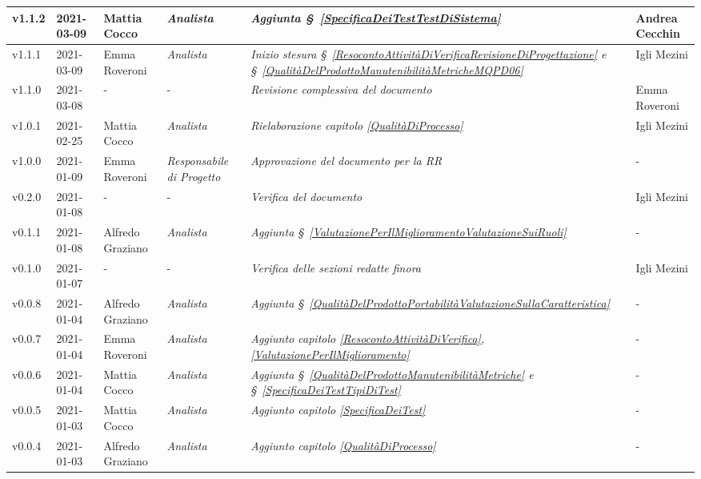 {\begin{center}
\begin{longtable}[c]{|p{2cm-1\tabcolsep}|p{2cm}|p{}|p{}|p{}|p{4cm-2\tabcolsep}|}
		\hline
		\centering v1.1.2 & 2021-03-09 & Mattia Cocco & \centering \textit{Analista}  &  \textit{Aggiunta \S~\ref{SpecificaDeiTestTestDiSistema} } & Andrea Cecchin \\
		\hline
		\centering v1.1.1 & 2021-03-09 & Emma Roveroni & \centering \textit{Analista} &  \textit{Inizio stesura \S~\ref{ResocontoAttivitàDiVerificaRevisioneDiProgettazione} e \S~\ref{QualitàDelProdottoManutenibilitàMetricheMQPD06}} & Igli Mezini  \\
		\hline
		\centering v1.1.0 & 2021-03-08 & \centering - & \centering - &  \textit{Revisione complessiva del documento} & Emma Roveroni  \\
		\hline
		\centering v1.0.1 & 2021-02-25 & Mattia Cocco  & \centering \textit{Analista}  &  \textit{Rielaborazione capitolo \ref{QualitàDiProcesso}}  & Igli Mezini \\
		\hline
		\centering v1.0.0  &  2021-01-09 & Emma Roveroni & \centering \textit{Responsabile di Progetto}  & \textit{Approvazione del documento per la RR} & -\\
		\hline
		\centering v0.2.0 & 2021-01-08 & \centering - & \centering - & \textit{Verifica del documento} & Igli Mezini  \\
		\hline
		\centering v0.1.1 & 2021-01-08 & Alfredo Graziano & \centering \textit{Analista}  & \textit{Aggiunta \S~\ref{ValutazionePerIlMiglioramentoValutazioneSuiRuoli}} & - \\
		\hline
		\centering v0.1.0 & 2021-01-07 & \centering - & \centering -  & \textit{Verifica delle sezioni redatte finora} & Igli Mezini \\
		\hline
		\centering v0.0.8 & 2021-01-04 & Alfredo Graziano  & \centering \textit{Analista}  & \textit{Aggiunta  \S~\ref{QualitàDelProdottoPortabilitàValutazioneSullaCaratteristica}}  &  - \\
		\hline
		\centering v0.0.7 & 2021-01-04 &  Emma Roveroni & \centering \textit{Analista} & \textit{Aggiunto capitolo \ref{ResocontoAttivitàDiVerifica}, \ref{ValutazionePerIlMiglioramento} } &  - \\
		\hline
		\centering v0.0.6 & 2021-01-04 & Mattia Cocco  & \centering \textit{Analista}   &  \textit{Aggiunta \S~\ref{QualitàDelProdottoManutenibilitàMetriche} e  \S~\ref{SpecificaDeiTestTipiDiTest} } &  - \\
		\hline
		\centering v0.0.5 & 2021-01-03 & Mattia Cocco & \centering \textit{Analista}  & \textit{Aggiunto capitolo \ref{SpecificaDeiTest} } & -\\
		\hline
		\centering v0.0.4 & 2021-01-03 & Alfredo Graziano & \centering \textit{Analista}  & \textit{Aggiunto capitolo \ref{QualitàDiProcesso}} & - \\

\end{longtable}
\end{center}}

